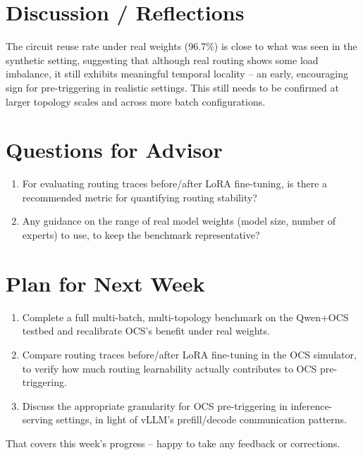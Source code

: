 \documentclass[11pt]{article}
\begin{document}
\section{Discussion / Reflections}

The circuit reuse rate under real weights (96.7\%) is close to what
was seen in the synthetic setting, suggesting that although real
routing shows some load imbalance, it still exhibits meaningful
temporal locality -- an early, encouraging sign for pre-triggering in
realistic settings. This still needs to be confirmed at larger
topology scales and across more batch configurations.

\section{Questions for Advisor}

\begin{enumerate}
  \item For evaluating routing traces before/after LoRA fine-tuning,
        is there a recommended metric for quantifying routing
        stability?
  \item Any guidance on the range of real model weights (model size,
        number of experts) to use, to keep the benchmark
        representative?
\end{enumerate}

\section{Plan for Next Week}

\begin{enumerate}
  \item Complete a full multi-batch, multi-topology benchmark on the
        Qwen+OCS testbed and recalibrate OCS's benefit under real
        weights.
  \item Compare routing traces before/after LoRA fine-tuning in the
        OCS simulator, to verify how much routing learnability
        actually contributes to OCS pre-triggering.
  \item Discuss the appropriate granularity for OCS pre-triggering in
        inference-serving settings, in light of vLLM's
        prefill/decode communication patterns.
\end{enumerate}

\vspace{1em}
\noindent That covers this week's progress -- happy to take any
feedback or corrections.

% 
% 
\end{document}
